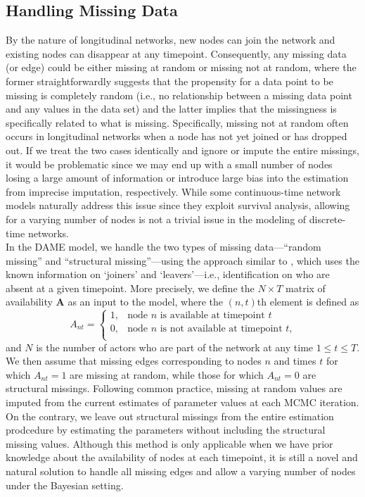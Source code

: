 \documentclass[a4paper]{article}
\begin{document}
\subsection{Handling Missing Data}\label{subsec: varying number of nodes}
By the nature of longitudinal networks, new nodes can join the network and existing nodes can disappear at any timepoint. Consequently, any missing data (or edge) could be either missing at random or missing not at random, where the former straightforwardly suggests that the propensity for a data point to be missing is completely random (i.e., no relationship between a missing data point and any values in the data set) and the latter implies that the missingness is specifically related to what is missing. Specifically, missing not at random often occurs in longitudinal networks when a node has not yet joined or has dropped out. If we treat the two cases identically and ignore or impute the entire missings, it would be problematic since we may end up with a small number of nodes losing a large amount of information or introduce large bias into the estimation from imprecise imputation, respectively.
 While some continuous-time network models \citep{butts2008relational,vu2011continuous} naturally address this issue since they exploit survival analysis, allowing for a varying number of nodes is not a trivial issue in the modeling of discrete-time networks. \\ \newline 
 In the DAME model, we handle the two types of missing data---``random missing'' and ``structural missing''---using the approach similar to \cite{snijders2010introduction}, which uses the known information on `joiners' and `leavers'---i.e., identification on who are absent at a given timepoint. More precisely, we define the $N\times T$ matrix of availability $\mathbf{A}$ as an input to the model, where the $(n, t)${th} element is defined as
\begin{equation*}
A_{nt} =\begin{cases}
1, & \mbox{node $n$ is available at timepoint $t$}\\
0, & \mbox{node $n$ is not available at timepoint $t$,}\\
\end{cases}
\end{equation*}
and $N$ is the number of actors who are part of the network at any time $1\leq t \leq T$. We then assume that missing edges corresponding to nodes $n$ and times $t$ for which $A_{nt} = 1$ are missing at random, while those for which $A_{nt} = 0$ are structural missings. Following common practice, missing at random values are imputed from the current estimates of parameter values at each MCMC iteration.  On the contrary, we leave out structural missings from the entire estimation prodcedure by estimating the parameters without including the structural missing values. Although this method is only applicable when we have prior knowledge about the availability of nodes at each timepoint, it is still a novel and natural solution to handle all missing edges and allow a varying number of nodes under the Bayesian setting.
\end{document}

